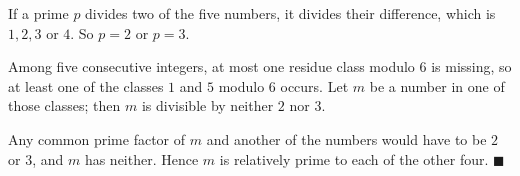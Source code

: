 If a prime $p$ divides two of the five numbers, it divides their difference, which is $1,2,3$ or $4$. So $p=2$ or $p=3$.

Among five consecutive integers, at most one residue class modulo $6$ is missing, so at least one of the classes $1$ and $5$ modulo $6$ occurs. Let $m$ be a number in one of those classes; then $m$ is divisible by neither $2$ nor $3$.

Any common prime factor of $m$ and another of the numbers would have to be $2$ or $3$, and $m$ has neither. Hence $m$ is relatively prime to each of the other four. $\blacksquare$
